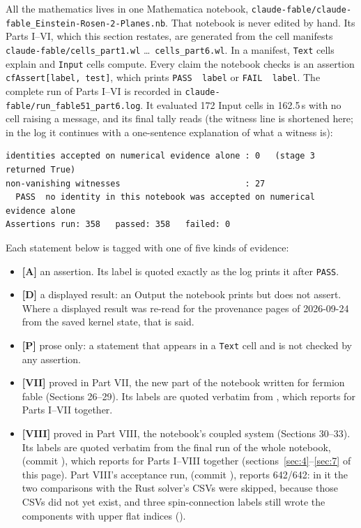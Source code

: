 All the mathematics lives in one Mathematica notebook,
\texttt{claude-fable/claude-fable\_Einstein-Rosen-2-Planes.nb}. That notebook is never edited by
hand. Its Parts I--VI, which this section restates, are generated from the cell manifests
\texttt{claude-fable/cells\_part1.wl} \dots\ \texttt{cells\_part6.wl}. In a manifest,
\texttt{Text} cells explain and \texttt{Input} cells compute. Every claim the notebook checks is
an assertion \texttt{cfAssert[label, test]}, which prints \texttt{PASS~~label} or
\texttt{FAIL~~label}. The complete run of Parts I--VI is recorded in
\texttt{claude-fable/run\_fable51\_part6.log}. It evaluated 172 Input cells in 162.5\,s with no
cell raising a message, and its final tally reads (the witness line is shortened here; in the
log it continues with a one-sentence explanation of what a witness is):
\begin{footnotesize}
\begin{verbatim}
identities accepted on numerical evidence alone : 0   (stage 3 returned True)
non-vanishing witnesses                         : 27
  PASS  no identity in this notebook was accepted on numerical evidence alone
Assertions run: 358   passed: 358   failed: 0
\end{verbatim}
\end{footnotesize}

Each statement below is tagged with one of five kinds of evidence:
\begin{itemize}
  \item \textbf{[A]} an assertion. Its label is quoted exactly as the log prints it after
        \texttt{PASS}.
  \item \textbf{[D]} a displayed result: an Output the notebook prints but does not assert.
        Where a displayed result was re-read for the provenance pages of 2026-09-24 from the saved kernel state,
        that is said.
  \item \textbf{[P]} prose only: a statement that appears in a \texttt{Text} cell and is not
        checked by any assertion.
  \item \textbf{[VII]} proved in Part VII, the new part of the notebook written for fermion
        fable (Sections 26--29). Its labels are quoted verbatim from
        , which reports
         for Parts I--VII together.
  \item \textbf{[VIII]} proved in Part VIII, the notebook's coupled system (Sections 30--33). Its
        labels are quoted verbatim from the final run of the whole notebook,
         (commit ), which reports
         for Parts I--VIII together
        (sections~\ref{sec:4}--\ref{sec:7} of this page). Part VIII's acceptance run,
         (commit ), reports 642/642: in
        it the two comparisons with the Rust solver's CSVs were skipped, because those CSVs did not yet
        exist, and three spin-connection labels still wrote the components with upper flat indices
        ().
\end{itemize}

